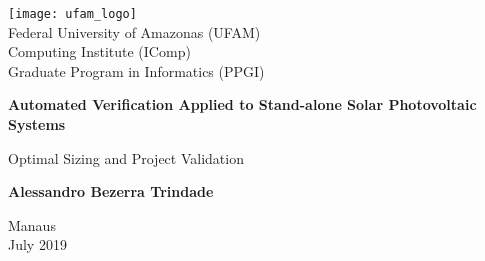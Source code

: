 \begin{titlepage}
    \begin{center}
      \texttt{[image: ufam\_logo]} \\
        \Large
        Federal University of Amazonas (UFAM)\\
        Computing Institute (IComp)\\
        Graduate Program in Informatics (PPGI)\\

        \vspace*{3cm}
        
        \Huge
        \textbf{Automated Verification Applied to Stand-alone Solar Photovoltaic Systems}
        
        \vspace{0.5cm}
        \LARGE
        Optimal Sizing and Project Validation

        \vspace{3.0cm}
        
        \textbf{Alessandro Bezerra Trindade}
        
%        
%        
        \vspace{3cm}
%        
        
        \Large
		Manaus \\

        July 2019 \\


    \end{center}
\end{titlepage}